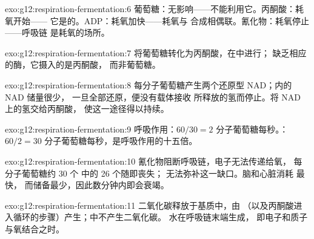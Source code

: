 \begin{solution}{exo:g12:respiration-fermentation:6}
葡萄糖：无影响——不能利用它。丙酮酸：耗氧开始——
它是的。ADP：耗氧加快——耗氧与
 合成相偶联。氰化物：耗氧停止——呼吸链
是耗氧的场所。
\end{solution}

\begin{solution}{exo:g12:respiration-fermentation:7}
将葡萄糖转化为丙酮酸，在中进行；
缺乏相应的酶，它摄入的是丙酮酸，
而非葡萄糖。
\end{solution}

\begin{solution}{exo:g12:respiration-fermentation:8}
每分子葡萄糖产生两个还原型 NAD；内的 NAD 储量很少，
一旦全部还原，便没有载体接收
所释放的氢而停止。将 NAD 上的氢交给丙酮酸，
使这一途径得以持续。
\end{solution}

\begin{solution}{exo:g12:respiration-fermentation:9}
呼吸作用：$60/30 = 2$ 分子葡萄糖每秒。：$60/2 = 30$
分子葡萄糖每秒，是呼吸作用的十五倍。
\end{solution}

\begin{solution}{exo:g12:respiration-fermentation:10}
氰化物阻断呼吸链，电子无法传递给氧，
每分子葡萄糖约 30 个  中的 26 个随即丧失；
无法弥补这一缺口。脑和心脏消耗  最快，
而储备最少，因此数分钟内即会衰竭。
\end{solution}

\begin{solution}{exo:g12:respiration-fermentation:11}
二氧化碳释放于基质中，由
（以及丙酮酸进入循环的步骤）产生；中不产生二氧化碳。
水在呼吸链末端生成，
即电子和质子与氧结合之时。
\end{solution}

